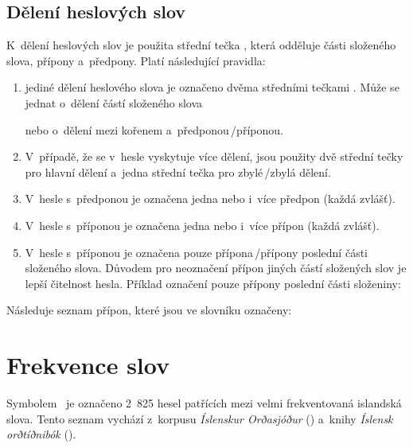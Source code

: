 \blspace
  \dicEntry {}   
\blspace

\subsection*{Dělení heslových slov}

K~dělení heslových slov je použita střední tečka , která odděluje části složeného slova, přípony a~předpony. Platí následující pravidla:

\renewcommand{\labelenumi}{\alph{enumi})}
\begin{enumerate}
\item jediné dělení heslového slova je označeno dvěma středními tečkami . Může se jednat o~dělení částí složeného slova
\blspace
\dicEntry {}
\blspace

nebo o~dělení mezi kořenem a~předponou\,/\addthin příponou.

\blspace
\dicEntry {}
\blspace
\item V~případě, že se v~hesle vyskytuje více dělení, jsou použity dvě střední tečky  pro hlavní dělení a~jedna střední tečka  pro zbylé\,/\addthin zbylá dělení.
\blspace
\dicEntry {}
\blspace
\item V~hesle s~předponou je označena jedna nebo i~více předpon (každá zvlášť).
\blspace
\dicEntry {}
\blspace
\item V~hesle s~příponou je označena jedna nebo i~více přípon (každá zvlášť).
\blspace
\dicEntry {}
\blspace
\item V~hesle s~příponou je označena pouze přípona\,/\addthin přípony poslední části složeného slova. Důvodem pro neoznačení přípon jiných částí složených slov je lepší čitelnost hesla. Příklad označení pouze přípony poslední části složeniny:
\blspace
\dicEntry {}
\end{enumerate}

Následuje seznam přípon, které jsou ve slovníku označeny:

\tableA

\section{Frekvence slov}

Symbolem \dicsymFrequent\ je označeno 2~825 hesel patřících mezi velmi frekventovaná islandská slova. Tento seznam vychází z~korpusu \textit{Íslenskur Orðasjóður} (\cite{int7}) a~knihy \textit{Íslensk orðtíðnibók} (\cite{is2}).

